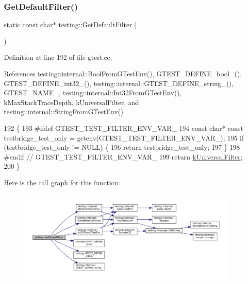 \subsubsection{\texorpdfstring{Get\+Default\+Filter()}{GetDefaultFilter()}}
{\footnotesize\ttfamily static const char$\ast$ testing\+::\+Get\+Default\+Filter (\begin{DoxyParamCaption}{ }\end{DoxyParamCaption})\hspace{0.3cm}{\ttfamily [static]}}



Definition at line 192 of file gtest.\+cc.



References testing\+::internal\+::\+Bool\+From\+G\+Test\+Env(), G\+T\+E\+S\+T\+\_\+\+D\+E\+F\+I\+N\+E\+\_\+bool\+\_\+(), G\+T\+E\+S\+T\+\_\+\+D\+E\+F\+I\+N\+E\+\_\+int32\+\_\+(), testing\+::internal\+::\+G\+T\+E\+S\+T\+\_\+\+D\+E\+F\+I\+N\+E\+\_\+string\+\_\+(), G\+T\+E\+S\+T\+\_\+\+N\+A\+M\+E\+\_\+, testing\+::internal\+::\+Int32\+From\+G\+Test\+Env(), k\+Max\+Stack\+Trace\+Depth, k\+Universal\+Filter, and testing\+::internal\+::\+String\+From\+G\+Test\+Env().


\begin{DoxyCode}
192                                       \{
193 \textcolor{preprocessor}{#ifdef GTEST\_TEST\_FILTER\_ENV\_VAR\_}
194   \textcolor{keyword}{const} \textcolor{keywordtype}{char}* \textcolor{keyword}{const} testbridge\_test\_only = getenv(GTEST\_TEST\_FILTER\_ENV\_VAR\_);
195   \textcolor{keywordflow}{if} (testbridge\_test\_only != NULL) \{
196     \textcolor{keywordflow}{return} testbridge\_test\_only;
197   \}
198 \textcolor{preprocessor}{#endif  // GTEST\_TEST\_FILTER\_ENV\_VAR\_}
199   \textcolor{keywordflow}{return} \hyperlink{namespacetesting_a236f8612e4b148d8d989a311a30a4557}{kUniversalFilter};
200 \}
\end{DoxyCode}
Here is the call graph for this function\+:
\nopagebreak
\begin{figure}[H]
\begin{center}
\leavevmode
\includegraphics[width=350pt]{namespacetesting_a56fbc164c7dc53596c23e519d8f1ca3c_cgraph}
\end{center}
\end{figure}
\mbox{\label{namespacetesting_acb3fdfadf475a3c2f5e22a3dae73532a}} 
